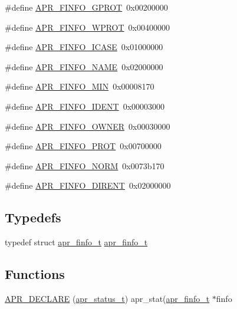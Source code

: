 \begin{DoxyCompactItemize}
\item 
\#define \hyperlink{group__apr__file__stat_gadfa294303e34528b1fcae1bc009140c1}{A\+P\+R\+\_\+\+F\+I\+N\+F\+O\+\_\+\+G\+P\+R\+OT}~0x00200000
\item 
\#define \hyperlink{group__apr__file__stat_gab970792384fe9a805cf66983350eefdc}{A\+P\+R\+\_\+\+F\+I\+N\+F\+O\+\_\+\+W\+P\+R\+OT}~0x00400000
\item 
\#define \hyperlink{group__apr__file__stat_gac46eeba0ae0e771c6ed3cb27fd5492d8}{A\+P\+R\+\_\+\+F\+I\+N\+F\+O\+\_\+\+I\+C\+A\+SE}~0x01000000
\item 
\#define \hyperlink{group__apr__file__stat_ga7fa4caf84808c11a1ec33c5c8d613e4b}{A\+P\+R\+\_\+\+F\+I\+N\+F\+O\+\_\+\+N\+A\+ME}~0x02000000
\item 
\#define \hyperlink{group__apr__file__stat_ga341104571b05550aa923cb14898a82ef}{A\+P\+R\+\_\+\+F\+I\+N\+F\+O\+\_\+\+M\+IN}~0x00008170
\item 
\#define \hyperlink{group__apr__file__stat_ga3ac8c8d0492291417be3d32556464108}{A\+P\+R\+\_\+\+F\+I\+N\+F\+O\+\_\+\+I\+D\+E\+NT}~0x00003000
\item 
\#define \hyperlink{group__apr__file__stat_ga27dee9407b38a459c57618098c3920b0}{A\+P\+R\+\_\+\+F\+I\+N\+F\+O\+\_\+\+O\+W\+N\+ER}~0x00030000
\item 
\#define \hyperlink{group__apr__file__stat_gad902be0636860cb3f8ad76a59abbcd7c}{A\+P\+R\+\_\+\+F\+I\+N\+F\+O\+\_\+\+P\+R\+OT}~0x00700000
\item 
\#define \hyperlink{group__apr__file__stat_gad3f64010d25d2fe926191804d7c99379}{A\+P\+R\+\_\+\+F\+I\+N\+F\+O\+\_\+\+N\+O\+RM}~0x0073b170
\item 
\#define \hyperlink{group__apr__file__stat_gaac6679307cc735f2f0373960db96b931}{A\+P\+R\+\_\+\+F\+I\+N\+F\+O\+\_\+\+D\+I\+R\+E\+NT}~0x02000000
\end{DoxyCompactItemize}
\subsection*{Typedefs}
\begin{DoxyCompactItemize}
\item 
typedef struct \hyperlink{structapr__finfo__t}{apr\+\_\+finfo\+\_\+t} \hyperlink{group__apr__file__stat_ga3d390fdda1d16ae462c11b2d3b18efd1}{apr\+\_\+finfo\+\_\+t}
\end{DoxyCompactItemize}
\subsection*{Functions}
\begin{DoxyCompactItemize}
\item 
\hyperlink{group__apr__file__stat_gaf4677630103e7b0971a3a5967fb7d829}{A\+P\+R\+\_\+\+D\+E\+C\+L\+A\+RE} (\hyperlink{group__apr__errno_gaa5105fa83cc322f09382292db8b47593}{apr\+\_\+status\+\_\+t}) apr\+\_\+stat(\hyperlink{structapr__finfo__t}{apr\+\_\+finfo\+\_\+t} $\ast$finfo
\end{DoxyCompactItemize}
